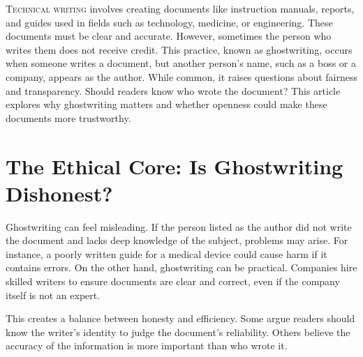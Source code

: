 \documentclass[a4paper,10pt,twocolumn]{memoir}
\begin{document}
\lettrine[lines=3]{T}{echnical writing}
involves creating documents like instruction manuals, reports, and guides used in fields such as technology, medicine, or engineering. These documents must be clear and accurate. However, sometimes the person who writes them does not receive credit. This practice, known as ghostwriting, occurs when someone writes a document, but another person’s name, such as a boss or a company, appears as the author. While common, it raises questions about fairness and transparency. Should readers know who wrote the document? This article explores why ghostwriting matters and whether openness could make these documents more trustworthy.

\section*{The Ethical Core: Is Ghostwriting Dishonest?}
Ghostwriting can feel misleading. If the person listed as the author did not write the document and lacks deep knowledge of the subject, problems may arise. For instance, a poorly written guide for a medical device could cause harm if it contains errors. On the other hand, ghostwriting can be practical. Companies hire skilled writers to ensure documents are clear and correct, even if the company itself is not an expert.

This creates a balance between honesty and efficiency. Some argue readers should know the writer’s identity to judge the document’s reliability. Others believe the accuracy of the information is more important than who wrote it.
\end{document}

